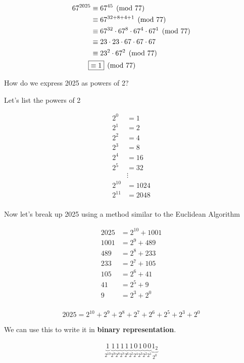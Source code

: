 \documentclass[../../Main.tex]{subfiles}
\begin{document}
\begin{work}
    \begin{align*}
        67^{2025} &\equiv 67^{45} \pmod{77} \\
        &\equiv 67^{32 + 8 + 4 + 1} \pmod{77} \\
        &\equiv 67^{32} \cdot 67^8 \cdot 67^4 \cdot 67^1 \pmod{77} \\
        &\equiv 23 \cdot 23 \cdot 67 \cdot 67 \cdot 67 \\
        &\equiv 23^2 \cdot 67^2 \pmod{77} \\
        \Aboxed{&\equiv 1} \pmod{77} \\
    \end{align*}

    How do we express 2025 as powers of 2?

    Let's list the powers of 2

    \begin{align*}
        2^0 &= 1 \\
        2^1 &= 2 \\
        2^2 &= 4 \\
        2^3 &= 8 \\
        2^4 &= 16 \\
        2^5 &= 32 \\
        &\vdots \\
        2^{10} &= 1024 \\
        2^{11} &= 2048 \\
    \end{align*}

    Now let's break up 2025 using a method similar to the Euclidean Algorithm

    \begin{align*}
        2025 &= 2^{10} + 1001 \\
        1001 &= 2^9 + 489 \\
        489 &= 2^8 + 233 \\
        233 &= 2^7 + 105 \\
        105 &= 2^6 + 41 \\
        41 &= 2^5 + 9 \\
        9 &= 2^3 + 2^0 \\
    \end{align*}

    $$2025 = 2^{10} + 2^9 + 2^8 + 2^7 + 2^6 + 2^5 + 2^3 + 2^0$$
    
    We can use this to write it in \textbf{binary representation}.

    \begin{align*}
        \underbrace{1}_{2^{10}}
        \underbrace{1}_{2^9}
        \underbrace{1}_{2^8}
        \underbrace{1}_{2^7}
        \underbrace{1}_{2^6}
        \underbrace{1}_{2^5}
        \underbrace{0}_{2^4}
        \underbrace{1}_{2^3}
        \underbrace{0}_{2^2}
        \underbrace{0}_{2^1}
        \underbrace{1_2}_{2^0}
    \end{align*}


\end{work}
\end{document}
